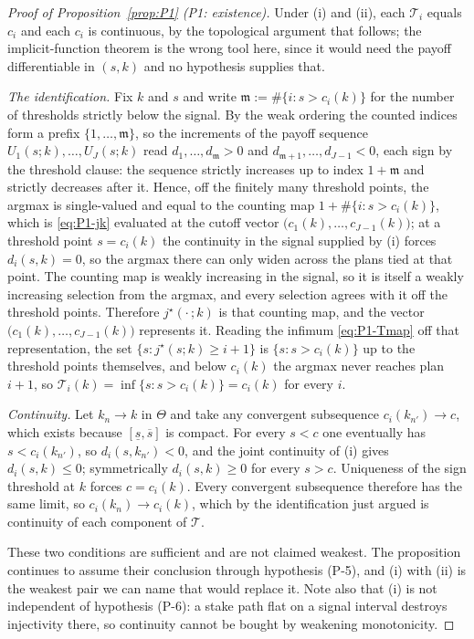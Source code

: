 \documentclass[11pt]{article}
\newcommand{\Tmap}{\mathcal{T}}
\begin{document}
\begin{proof}[Proof of Proposition~\ref{prop:P1} (P1: existence)]
Under (i) and (ii), each $\Tmap_i$ equals $c_i$ and each $c_i$ is continuous, by the topological
argument that follows; the implicit-function theorem is the wrong tool here, since it would need the
payoff differentiable in $(s,k)$ and no hypothesis supplies that.

\emph{The identification.} Fix $k$ and $s$ and write $\mathfrak m := \#\{i : s > c_i(k)\}$ for the
number of thresholds strictly below the signal. By the weak ordering the counted indices form a
prefix $\{1,\dots,\mathfrak m\}$, so the increments of the payoff sequence
$U_1(s;k),\dots,U_J(s;k)$ read $d_1,\dots,d_{\mathfrak m} > 0$ and
$d_{\mathfrak m+1},\dots,d_{J-1} < 0$, each sign by the threshold clause: the sequence strictly
increases up to index $1+\mathfrak m$ and strictly decreases after it. Hence, off the finitely many
threshold points, the argmax is single-valued and equal to the counting map
$1+\#\{i : s > c_i(k)\}$, which is \eqref{eq:P1-jk} evaluated at the cutoff vector
$\bigl(c_1(k),\dots,c_{J-1}(k)\bigr)$; at a threshold point $s = c_i(k)$ the continuity in the signal
supplied by (i) forces $d_i(s,k) = 0$, so the argmax there can only widen across the plans tied at
that point. The counting map is weakly increasing in the signal, so it is itself a weakly increasing
selection from the argmax, and every selection agrees with it off the threshold points. Therefore
$j^\star(\cdot\,;k)$ is that counting map, and the vector $\bigl(c_1(k),\dots,c_{J-1}(k)\bigr)$
represents it. Reading the infimum \eqref{eq:P1-Tmap} off that representation, the set
$\{s : j^\star(s;k) \ge i+1\}$ is $\{s : s > c_i(k)\}$ up to the threshold points themselves, and
below $c_i(k)$ the argmax never reaches plan $i+1$, so
$\Tmap_i(k) = \inf\{s : s > c_i(k)\} = c_i(k)$ for every $i$.

\emph{Continuity.} Let $k_n \to k$ in $\Theta$ and take any convergent subsequence
$c_i(k_{n'}) \to c$, which exists because $[\underline s,\overline s]$ is compact. For every $s < c$
one eventually has $s < c_i(k_{n'})$, so $d_i(s,k_{n'}) < 0$, and the joint continuity of (i) gives
$d_i(s,k) \le 0$; symmetrically $d_i(s,k) \ge 0$ for every $s > c$. Uniqueness of the sign threshold
at $k$ forces $c = c_i(k)$. Every convergent subsequence therefore has the same limit, so
$c_i(k_n) \to c_i(k)$, which by the identification just argued is continuity of each component of
$\Tmap$.

These two conditions are sufficient and are not claimed weakest. The proposition continues to assume
their conclusion through hypothesis (P-5), and (i) with (ii) is the weakest pair we can name that
would replace it. Note also that (i) is not independent of hypothesis (P-6): a stake path flat on a
signal interval destroys injectivity there, so continuity cannot be bought by weakening
monotonicity.


\end{proof}
\end{document}
